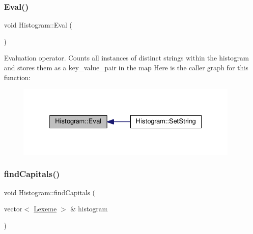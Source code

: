 \subsubsection{\texorpdfstring{Eval()}{Eval()}}
{\footnotesize\ttfamily void Histogram\+::\+Eval (\begin{DoxyParamCaption}{ }\end{DoxyParamCaption})}

Evaluation operator. Counts all instances of distinct strings within the histogram and stores them as a key\+\_\+value\+\_\+pair in the map Here is the caller graph for this function\+:
\nopagebreak
\begin{figure}[H]
\begin{center}
\leavevmode
\includegraphics[width=311pt]{class_histogram_af4fdfc3e8e4c4028deaf9b663ee5832c_icgraph}
\end{center}
\end{figure}
\mbox{\label{class_histogram_a97384bc67a4fcbd79f405329de0a4b41}} 
\subsubsection{\texorpdfstring{find\+Capitals()}{findCapitals()}}
{\footnotesize\ttfamily void Histogram\+::find\+Capitals (\begin{DoxyParamCaption}\item[{vector$<$ \hyperlink{class_lexeme}{Lexeme} $>$ \&}]{histogram }\end{DoxyParamCaption})}

